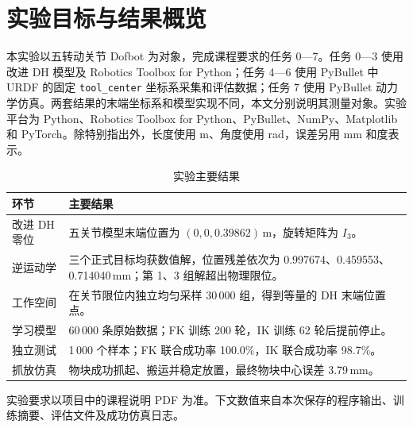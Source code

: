 \documentclass[12pt,a4paper,UTF8]{ctexart}
\begin{document}
\cover
\reportfrontmatter
\begin{abstract}
本实验围绕五转动关节 Dofbot，依次完成改进 DH 建模、正逆运动学、工作空间采样、数据驱动 FK/IK 训练与评估，以及 PyBullet 物块抓取放置。改进 DH 模型使用全部四个给定几何尺寸，数学零位末端高度为 0.39862\,m。三组正式目标的逆解求解器均返回成功，FK 复算位置残差为 0.997674、0.459553 和 0.714040\,mm，其中两组解超出物理关节限位。工作空间实验在限位内采样 30\,000 组关节角。学习实验使用 60\,000 条 PyBullet 样本训练 FK 和双候选 IK；在 1\,000 条独立可达目标上，以 10\,mm、5° 为位置及姿态判据，FK、IK 的联合成功率分别为 100.0\% 和 98.7\%。抓放仿真最终使物块稳定落在目标附近，中心误差为 3.79\,mm。报告区分数学模型、URDF TCP、物理关节限位与动力学仿真的不同含义，并讨论学习模型的尾部误差和抓放结果的适用范围。

\noindent\textbf{关键词：}Dofbot；改进 DH；正逆运动学；工作空间；神经网络；PyBullet
\end{abstract}
\clearpage
\tableofcontents
\reportmainmatter

\section{实验目标与结果概览}
本实验以五转动关节 Dofbot 为对象，完成课程要求的任务 0—7。任务 0—3 使用改进 DH 模型及 Robotics Toolbox for Python；任务 4—6 使用 PyBullet 中 URDF 的固定 \texttt{tool\_center} 坐标系采集和评估数据；任务 7 使用 PyBullet 动力学仿真。两套结果的末端坐标系和模型实现不同，本文分别说明其测量对象。实验平台为 Python、Robotics Toolbox for Python、PyBullet、NumPy、Matplotlib 和 PyTorch。除特别指出外，长度使用 m、角度使用 rad，误差另用 mm 和度表示。
\begin{table}[!htbp]
\centering\small
\caption{实验主要结果}\label{tab:overview}
\begin{tabularx}{\textwidth}{@{}p{2.6cm}X@{}}
\toprule
环节 & 主要结果\\ \midrule
改进 DH 零位 & 五关节模型末端位置为 $(0,0,0.39862)$\,m，旋转矩阵为 $I_3$。\\
逆运动学 & 三个正式目标均获数值解，位置残差依次为 0.997674、0.459553、0.714040\,mm；第 1、3 组解超出物理限位。\\
工作空间 & 在关节限位内独立均匀采样 30\,000 组，得到等量的 DH 末端位置点。\\
学习模型 & 60\,000 条原始数据；FK 训练 200 轮，IK 训练 62 轮后提前停止。\\
独立测试 & 1\,000 个样本；FK 联合成功率 100.0\%，IK 联合成功率 98.7\%。\\
抓放仿真 & 物块成功抓起、搬运并稳定放置，最终物块中心误差 3.79\,mm。\\
\bottomrule
\end{tabularx}
\end{table}
实验要求以项目中的课程说明 PDF 为准。下文数值来自本次保存的程序输出、训练摘要、评估文件及成功仿真日志。
\end{document}
